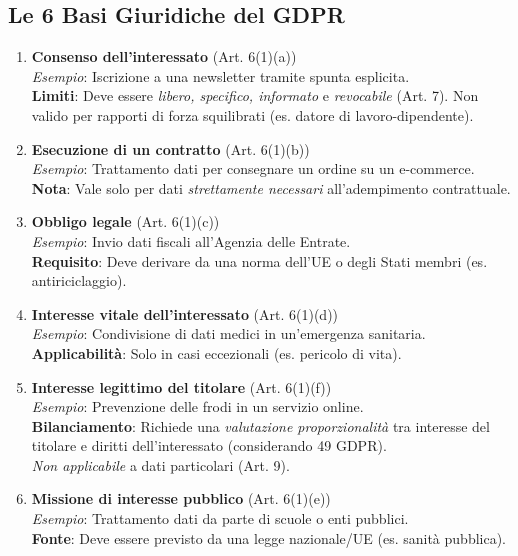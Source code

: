 \documentclass[8pt,oneside,a4paper]{article}
\begin{document}
	\subsection{Le 6 Basi Giuridiche del GDPR}
	\begin{enumerate}
		\item \textbf{Consenso dell’interessato} (Art. 6(1)(a)) \\
		\textit{Esempio}: Iscrizione a una newsletter tramite spunta esplicita. \\
		\textbf{Limiti}: Deve essere \textit{libero, specifico, informato} e \textit{revocabile} (Art. 7). Non valido per rapporti di forza squilibrati (es. datore di lavoro-dipendente).\\
		\item \textbf{Esecuzione di un contratto} (Art. 6(1)(b)) \\
		\textit{Esempio}: Trattamento dati per consegnare un ordine su un e-commerce. \\
		\textbf{Nota}: Vale solo per dati \textit{strettamente necessari} all’adempimento contrattuale.\\
		\item \textbf{Obbligo legale} (Art. 6(1)(c)) \\
		\textit{Esempio}: Invio dati fiscali all’Agenzia delle Entrate. \\
		\textbf{Requisito}: Deve derivare da una norma dell’UE o degli Stati membri (es. antiriciclaggio).\\
		\item \textbf{Interesse vitale dell’interessato} (Art. 6(1)(d)) \\
		\textit{Esempio}: Condivisione di dati medici in un’emergenza sanitaria. \\
		\textbf{Applicabilità}: Solo in casi eccezionali (es. pericolo di vita).\\
		\item \textbf{Interesse legittimo del titolare} (Art. 6(1)(f)) \\
		\textit{Esempio}: Prevenzione delle frodi in un servizio online. \\
		\textbf{Bilanciamento}: Richiede una \textit{valutazione proporzionalità} tra interesse del titolare e diritti dell’interessato (considerando 49 GDPR).\\ \textit{Non applicabile} a dati particolari (Art. 9).\\
		\item \textbf{Missione di interesse pubblico} (Art. 6(1)(e)) \\
		\textit{Esempio}: Trattamento dati da parte di scuole o enti pubblici. \\
		\textbf{Fonte}: Deve essere previsto da una legge nazionale/UE (es. sanità pubblica).\\
	\end{enumerate}
\end{document}
